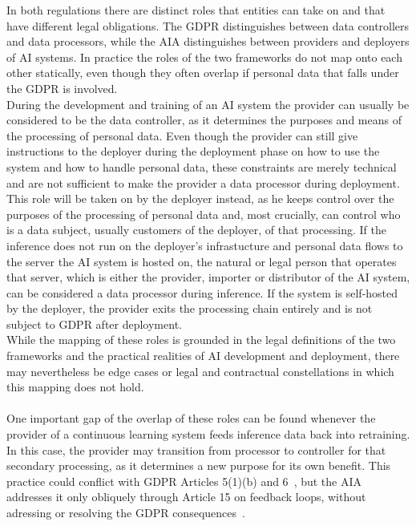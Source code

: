 \documentclass[
	a4paper, %
	10pt, %
	unnumberedsections, %
	twoside, %
]{LTJournalArticle}
\begin{document}
In both regulations there are distinct roles that entities can take on and that have different legal obligations. The GDPR distinguishes between data controllers and data processors, while the AIA distinguishes between providers and deployers of AI systems.
In practice the roles of the two frameworks do not map onto each other statically, even though they often overlap if personal data that falls under the GDPR is involved.\\
During the development and training of an AI system the provider can usually be considered to be the data controller, as it determines the purposes and means of the processing of personal data.
Even though the provider can still give instructions to the deployer during the deployment phase on how to use the system and how to handle personal data, these constraints are merely technical and are not sufficient to make the provider a data processor during
deployment. This role will be taken on by the deployer instead, as he keeps control over the purposes of the processing of personal data and, most crucially, can control who is a data subject, usually customers of the deployer, of that processing.
If the inference does not run on the deployer's infrastucture and personal data flows to the server the AI system is hosted on, the natural or legal person that operates that server, which is either the provider, importer or distributor of the AI system,
can be considered a data processor during inference. If the system is self-hosted by the deployer, the provider exits the processing chain entirely and is not subject to GDPR after deployment.~\cite{euaiact2024, eugdpr2016}\\
While the mapping of these roles is grounded in the legal definitions of the two frameworks and the practical realities of AI development and deployment, there may nevertheless be edge cases or legal and contractual constellations in which this mapping does not hold.\\
\\
One important gap of the overlap of these roles can be found whenever the provider of a continuous learning system feeds inference data back into retraining.
In this case, the provider may transition from processor to controller for that secondary processing, as it determines a new purpose for its own benefit. 
This practice could conflict with GDPR Articles 5(1)(b) and 6~\cite{eugdpr2016}, but the AIA addresses it only obliquely through Article 15 on feedback loops, without adressing or resolving the GDPR consequences~\cite{euaiact2024}.\\
\end{document}
